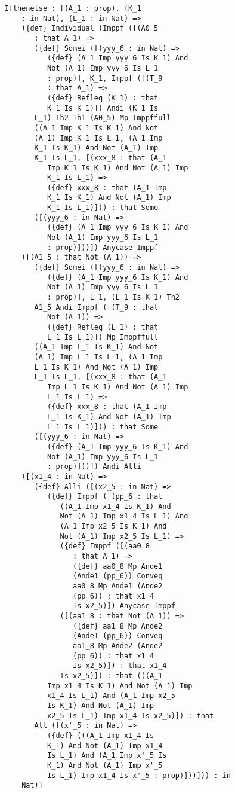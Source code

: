 \documentclass{article}
\begin{document}
\begin{verbatim}
   Ifthenelse : [(A_1 : prop), (K_1 
       : in Nat), (L_1 : in Nat) => 
       ({def} Individual (Imppf ([(A0_5 
          : that A_1) => 
          ({def} Somei ([(yyy_6 : in Nat) => 
             ({def} (A_1 Imp yyy_6 Is K_1) And 
             Not (A_1) Imp yyy_6 Is L_1 
             : prop)], K_1, Imppf ([(T_9 
             : that A_1) => 
             ({def} Refleq (K_1) : that 
             K_1 Is K_1)]) Andi (K_1 Is 
          L_1) Th2 Th1 (A0_5) Mp Imppffull 
          ((A_1 Imp K_1 Is K_1) And Not 
          (A_1) Imp K_1 Is L_1, (A_1 Imp 
          K_1 Is K_1) And Not (A_1) Imp 
          K_1 Is L_1, [(xxx_8 : that (A_1 
             Imp K_1 Is K_1) And Not (A_1) Imp 
             K_1 Is L_1) => 
             ({def} xxx_8 : that (A_1 Imp 
             K_1 Is K_1) And Not (A_1) Imp 
             K_1 Is L_1)])) : that Some 
          ([(yyy_6 : in Nat) => 
             ({def} (A_1 Imp yyy_6 Is K_1) And 
             Not (A_1) Imp yyy_6 Is L_1 
             : prop)]))]) Anycase Imppf 
       ([(A1_5 : that Not (A_1)) => 
          ({def} Somei ([(yyy_6 : in Nat) => 
             ({def} (A_1 Imp yyy_6 Is K_1) And 
             Not (A_1) Imp yyy_6 Is L_1 
             : prop)], L_1, (L_1 Is K_1) Th2 
          A1_5 Andi Imppf ([(T_9 : that 
             Not (A_1)) => 
             ({def} Refleq (L_1) : that 
             L_1 Is L_1)]) Mp Imppffull 
          ((A_1 Imp L_1 Is K_1) And Not 
          (A_1) Imp L_1 Is L_1, (A_1 Imp 
          L_1 Is K_1) And Not (A_1) Imp 
          L_1 Is L_1, [(xxx_8 : that (A_1 
             Imp L_1 Is K_1) And Not (A_1) Imp 
             L_1 Is L_1) => 
             ({def} xxx_8 : that (A_1 Imp 
             L_1 Is K_1) And Not (A_1) Imp 
             L_1 Is L_1)])) : that Some 
          ([(yyy_6 : in Nat) => 
             ({def} (A_1 Imp yyy_6 Is K_1) And 
             Not (A_1) Imp yyy_6 Is L_1 
             : prop)]))]) Andi Alli 
       ([(x1_4 : in Nat) => 
          ({def} Alli ([(x2_5 : in Nat) => 
             ({def} Imppf ([(pp_6 : that 
                ((A_1 Imp x1_4 Is K_1) And 
                Not (A_1) Imp x1_4 Is L_1) And 
                (A_1 Imp x2_5 Is K_1) And 
                Not (A_1) Imp x2_5 Is L_1) => 
                ({def} Imppf ([(aa0_8 
                   : that A_1) => 
                   ({def} aa0_8 Mp Ande1 
                   (Ande1 (pp_6)) Conveq 
                   aa0_8 Mp Ande1 (Ande2 
                   (pp_6)) : that x1_4 
                   Is x2_5)]) Anycase Imppf 
                ([(aa1_8 : that Not (A_1)) => 
                   ({def} aa1_8 Mp Ande2 
                   (Ande1 (pp_6)) Conveq 
                   aa1_8 Mp Ande2 (Ande2 
                   (pp_6)) : that x1_4 
                   Is x2_5)]) : that x1_4 
                Is x2_5)]) : that (((A_1 
             Imp x1_4 Is K_1) And Not (A_1) Imp 
             x1_4 Is L_1) And (A_1 Imp x2_5 
             Is K_1) And Not (A_1) Imp 
             x2_5 Is L_1) Imp x1_4 Is x2_5)]) : that 
          All ([(x'_5 : in Nat) => 
             ({def} (((A_1 Imp x1_4 Is 
             K_1) And Not (A_1) Imp x1_4 
             Is L_1) And (A_1 Imp x'_5 Is 
             K_1) And Not (A_1) Imp x'_5 
             Is L_1) Imp x1_4 Is x'_5 : prop)]))])) : in 
       Nat)]



\end{verbatim}
\end{document}
